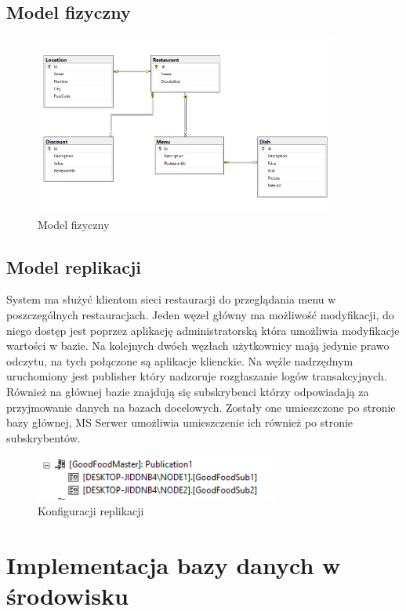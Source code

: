 \documentclass{article}
\begin{document}
	\subsection{Model fizyczny}

\begin{figure}[hbt!]
				\includegraphics[width=10cm]{Files/Pictures/Model}
				\centering
				\caption{Model fizyczny}
			\end{figure}
	
	\subsection{Model replikacji}	
	System ma służyć klientom sieci restauracji do przeglądania menu w poszczególnych restauracjach. Jeden węzeł główny ma możliwość modyfikacji, do niego dostęp jest poprzez aplikację administratorską która umożliwia modyfikacje wartości w bazie. Na kolejnych dwóch węzłach użytkownicy mają jedynie prawo odczytu, na tych połączone są aplikacje klienckie. Na węźle nadrzędnym uruchomiony jest publisher który nadzoruje rozgłaszanie logów transakcyjnych. Również na głównej bazie znajdują się subskrybenci którzy odpowiadają za przyjmowanie danych na bazach docelowych. Zostały one umieszczone po stronie bazy głównej, MS Serwer umożliwia umieszczenie ich również po stronie subskrybentów.
	
	
	
	\begin{figure}[hbt!]
		\includegraphics[width=8cm]{Files/Pictures/repSub}
		\centering
		\caption{Konfiguracji replikacji}
	\end{figure}
	

\newpage
\section{Implementacja bazy danych w środowisku}
\end{document}

